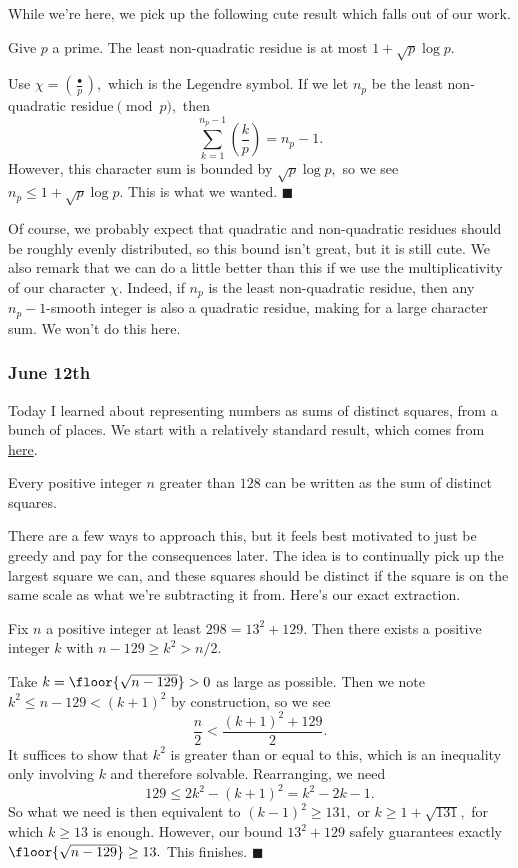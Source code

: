 While we're here, we pick up the following cute result which falls out of our work.
\begin{proposition}
    Give $p$ a prime. The least non-quadratic residue is at most $1+\sqrt p\log p.$
\end{proposition}
Use $\chi=\left(\frac\bullet p\right),$ which is the Legendre symbol. If we let $n_p$ be the least non-quadratic residue$\pmod p,$ then
\[\sum_{k=1}^{n_p-1}\left(\frac kp\right)=n_p-1.\]
However, this character sum is bounded by $\sqrt p\log p,$ so we see $n_p\le1+\sqrt p\log p.$ This is what we wanted. $\blacksquare$

Of course, we probably expect that quadratic and non-quadratic residues should be roughly evenly distributed, so this bound isn't great, but it is still cute. We also remark that we can do a little better than this if we use the multiplicativity of our character $\chi.$ Indeed, if $n_p$ is the least non-quadratic residue, then any $n_p-1$-smooth integer is also a quadratic residue, making for a large character sum. We won't do this here.

\subsubsection{June 12th}
Today I learned about representing numbers as sums of distinct squares, from a bunch of places. We start with a relatively standard result, which comes from \href{https://math.stackexchange.com/a/4021787/869257}{here}.
\begin{proposition}
    Every positive integer $n$ greater than $128$ can be written as the sum of distinct squares.
\end{proposition}
There are a few ways to approach this, but it feels best motivated to just be greedy and pay for the consequences later. The idea is to continually pick up the largest square we can, and these squares should be distinct if the square is on the same scale as what we're subtracting it from. Here's our exact extraction.
\begin{lemma}
    Fix $n$ a positive integer at least $298=13^2+129.$ Then there exists a positive integer $k$ with $n-129\ge k^2>n/2.$
\end{lemma}
Take $k=\floor{\sqrt{n-129}}>0$ as large as possible. Then we note $k^2\le n-129<(k+1)^2$ by construction, so we see
\[\frac n2<\frac{(k+1)^2+129}2.\]
It suffices to show that $k^2$ is greater than or equal to this, which is an inequality only involving $k$ and therefore solvable. Rearranging, we need
\[129\le2k^2-(k+1)^2=k^2-2k-1.\]
So what we need is then equivalent to $(k-1)^2\ge131,$ or $k\ge1+\sqrt{131},$ for which $k\ge13$ is enough. However, our bound $13^2+129$ safely guarantees exactly $\floor{\sqrt{n-129}}\ge13.$ This finishes. $\blacksquare$


